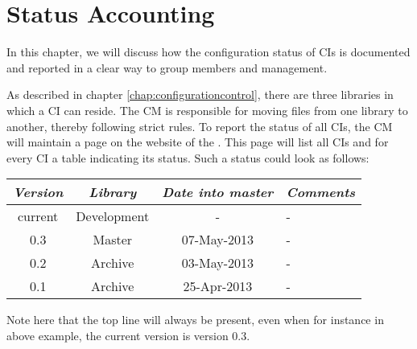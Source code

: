 \chapter{Status Accounting}
\label{chap:statusaccounting}
In this chapter, we will discuss how the configuration status of CIs is documented and reported in a clear way to group members and management.

As described in chapter \ref{chap:configurationcontrol}, there are three libraries in which a CI can reside. The CM is responsible for moving files from one library to another, thereby following strict rules. To report the status of all CIs, the CM will maintain a page on the website of the \applicationname{}. This page will list all CIs and for every CI a table indicating its status. Such a status could look as follows:

\begin{center}
\begin{tabular}{@{}cccl@{}}
	\toprule
	\emph{Version} & \emph{Library} & \emph{Date into master} & \emph{Comments} \\
	\midrule
	current & Development &           - & - \\
	0.3     & Master      & 07-May-2013 & - \\
	0.2     & Archive     & 03-May-2013 & - \\
	0.1     & Archive     & 25-Apr-2013 & - \\
	\bottomrule
\end{tabular}
\end{center}

\noindent Note here that the top line will always be present, even when for instance in above example, the current version is version 0.3.